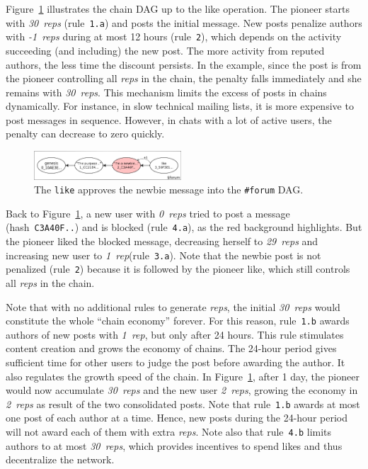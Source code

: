 \documentclass[10pt,journal,compsoc]{IEEEtran}
\newcommand{\reps}     {\emph{reps}\xspace}
\newcommand{\onerep}   {\emph{1~rep}\xspace}
\newcommand{\nreps}[1] {\emph{#1~reps\xspace}}
\newcommand{\code}[1]  {\texttt{\footnotesize{#1}}}
\begin{document}
Figure~\ref{fig.forum} illustrates the chain DAG up to the like operation.
The pioneer starts with \nreps{30} (rule~\code{1.a}) and posts the initial
message.
%
New posts penalize authors with \nreps{-1} during at most 12 hours
(rule~\code{2}), which depends on the activity succeeding (and including) the
new post.
The more activity from reputed authors, the less time the discount persists.
In the example, since the post is from the pioneer controlling all \reps in the
chain, the penalty falls immediately and she remains with \nreps{30}.
This mechanism limits the excess of posts in chains dynamically.
For instance, in slow technical mailing lists, it is more expensive to post
messages in sequence.
However, in chats with a lot of active users, the penalty can decrease to zero
quickly.

\begin{figure}
\centering
\includegraphics[width=0.49\textwidth]{forum.png}
\caption{
    The \code{like} approves the newbie message into the \code{\#forum} DAG.
}
\label{fig.forum}
\end{figure}

Back to Figure~\ref{fig.forum}, a new user with \nreps{0} tried to post a
message (hash~\code{C3A40F..}) and is blocked (rule~\code{4.a}), as the red
background highlights.
But the pioneer liked the blocked message, decreasing herself to \nreps{29}
and increasing new user to \onerep (rule~\code{3.a}).
Note that the newbie post is not penalized (rule~\code{2}) because it is
followed by the pioneer like, which still controls all \reps in the chain.

Note that with no additional rules to generate \reps, the initial \nreps{30}
would constitute the whole ``chain economy'' forever.
For this reason, rule~\code{1.b} awards authors of new posts with \onerep,
but only after 24 hours.
This rule stimulates content creation and grows the economy of chains.
The 24-hour period gives sufficient time for other users to judge the post
before awarding the author.
It also regulates the growth speed of the chain.
In Figure~\ref{fig.forum}, after 1 day, the pioneer would now accumulate
\nreps{30} and the new user \nreps{2}, growing the economy in \nreps{2} as
result of the two consolidated posts.
Note that rule~\code{1.b} awards at most one post of each author at a time.
Hence, new posts during the 24-hour period will not award each of them with
extra \reps.
Note also that rule~\code{4.b} limits authors to at most \nreps{30}, which
provides incentives to spend likes and thus decentralize the network.
\end{document}
